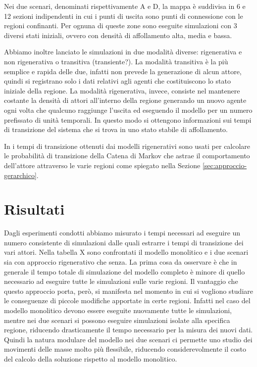 Nei due scenari, denominati rispettivamente A e D, la mappa è suddivisa in 6 e 12 sezioni indipendenti in cui i punti di uscita sono punti di connessione con le regioni confinanti. Per ognuna di queste zone sono eseguite simulazioni con 3 diversi stati iniziali, ovvero con densità di affollamento alta, media e bassa. 

Abbiamo inoltre lanciato le simulazioni in due modalità diverse: rigenerativa e non rigenerativa o transitiva (transiente?). La modalità transitiva è la più semplice e rapida delle due, infatti non prevede la generazione di alcun attore, quindi si registrano solo i dati relativi agli agenti che costituiscono lo stato iniziale della regione. La modalità rigenerativa, invece, consiste nel mantenere costante la densità di attori all'interno della regione generando un nuovo agente ogni volta che qualcuno raggiunge l'uscita ed eseguendo il modello per un numero prefissato di unità temporali. In questo modo si ottengono informazioni sui tempi di transizione del sistema che si trova in uno stato stabile di affollamento.

In \cite{esperimenti-sandro} i tempi di transizione ottenuti dai modelli rigenerativi sono usati per calcolare le probabilità di transizione della Catena di Markov che astrae il comportamento dell'attore attraverso le varie regioni come spiegato nella Sezione \ref{sec:approccio-gerarchico}.



\section{Risultati}

Dagli esperimenti condotti abbiamo misurato i tempi necessari ad eseguire un numero consistente di simulazioni dalle quali estrarre i tempi di transizione dei vari attori. Nella tabella X sono confrontati il modello monolitico e i due scenari sia con approccio rigenerativo che senza. La prima cosa da osservare è che in generale il tempo totale di simulazione del modello completo è minore di quello necessario ad eseguire tutte le simulazioni sulle varie regioni. Il vantaggio che questo approccio porta, però, si manifesta nel momento in cui si vogliono studiare le conseguenze di piccole modifiche apportate in certe regioni. Infatti nel caso del modello monolitico devono essere eseguite nuovamente tutte le simulazioni, mentre nei due scenari si possono eseguire simulazioni isolate alla specifica regione, riducendo drasticamente il tempo necessario per la misura dei nuovi dati. Quindi la natura modulare del modello nei due scenari ci permette uno studio dei movimenti delle masse molto più flessibile, riducendo considerevolmente il costo del calcolo della soluzione rispetto al modello monolitico.

